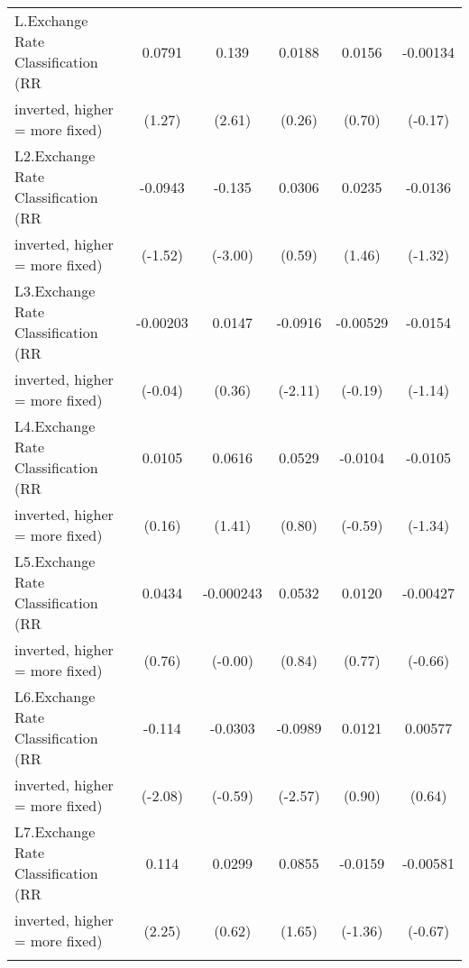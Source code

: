 {\begin{tabular}{l*{5}{c}}
\addlinespace
L.Exchange Rate Classification (RR      &   0.0791         &    0.139\sym{*}  &   0.0188         &   0.0156         & -0.00134         \\
inverted, higher = more fixed)          &   (1.27)         &   (2.61)         &   (0.26)         &   (0.70)         &  (-0.17)         \\
\addlinespace
L2.Exchange Rate Classification (RR     &  -0.0943         &   -0.135\sym{**} &   0.0306         &   0.0235         &  -0.0136         \\
inverted, higher = more fixed)          &  (-1.52)         &  (-3.00)         &   (0.59)         &   (1.46)         &  (-1.32)         \\
\addlinespace
L3.Exchange Rate Classification (RR     & -0.00203         &   0.0147         &  -0.0916\sym{*}  & -0.00529         &  -0.0154         \\
inverted, higher = more fixed)          &  (-0.04)         &   (0.36)         &  (-2.11)         &  (-0.19)         &  (-1.14)         \\
\addlinespace
L4.Exchange Rate Classification (RR     &   0.0105         &   0.0616         &   0.0529         &  -0.0104         &  -0.0105         \\
inverted, higher = more fixed)          &   (0.16)         &   (1.41)         &   (0.80)         &  (-0.59)         &  (-1.34)         \\
\addlinespace
L5.Exchange Rate Classification (RR     &   0.0434         &-0.000243         &   0.0532         &   0.0120         & -0.00427         \\
inverted, higher = more fixed)          &   (0.76)         &  (-0.00)         &   (0.84)         &   (0.77)         &  (-0.66)         \\
\addlinespace
L6.Exchange Rate Classification (RR     &   -0.114\sym{*}  &  -0.0303         &  -0.0989\sym{*}  &   0.0121         &  0.00577         \\
inverted, higher = more fixed)          &  (-2.08)         &  (-0.59)         &  (-2.57)         &   (0.90)         &   (0.64)         \\
\addlinespace
L7.Exchange Rate Classification (RR     &    0.114\sym{*}  &   0.0299         &   0.0855         &  -0.0159         & -0.00581         \\
inverted, higher = more fixed)          &   (2.25)         &   (0.62)         &   (1.65)         &  (-1.36)         &  (-0.67)         \\
\addlinespace

\end{tabular}}
